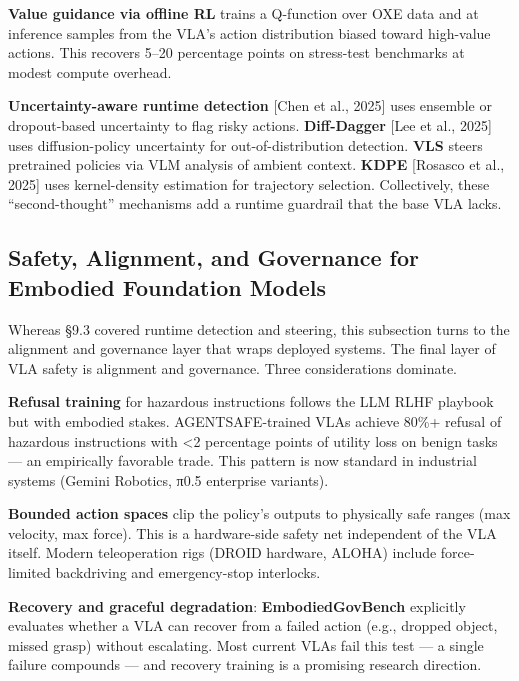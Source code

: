 \documentclass{article}
\begin{document}
\textbf{Value guidance via offline RL} \cite{nakamoto2024steeringyourgenera} trains a Q-function over OXE data and at inference samples from the VLA's action distribution biased toward high-value actions. This recovers 5--20 percentage points on stress-test benchmarks at modest compute overhead.

\textbf{Uncertainty-aware runtime detection} {[}Chen et al., 2025{]} uses ensemble or dropout-based uncertainty to flag risky actions. \textbf{Diff-Dagger} {[}Lee et al., 2025{]} uses diffusion-policy uncertainty for out-of-distribution detection. \textbf{VLS} \cite{liu2026vlssteeringpretrai} steers pretrained policies via VLM analysis of ambient context. \textbf{KDPE} {[}Rosasco et al., 2025{]} uses kernel-density estimation for trajectory selection. Collectively, these ``second-thought'' mechanisms add a runtime guardrail that the base VLA lacks.

\subsection{Safety, Alignment, and Governance for Embodied Foundation Models}\label{safety-alignment-and-governance-for-embodied-foundation-models}

Whereas §9.3 covered runtime detection and steering, this subsection turns to the alignment and governance layer that wraps deployed systems. The final layer of VLA safety is alignment and governance. Three considerations dominate.

\textbf{Refusal training} for hazardous instructions follows the LLM RLHF playbook but with embodied stakes. AGENTSAFE-trained VLAs achieve 80\%+ refusal of hazardous instructions with \textless2 percentage points of utility loss on benign tasks --- an empirically favorable trade. This pattern is now standard in industrial systems (Gemini Robotics, π0.5 enterprise variants).

\textbf{Bounded action spaces} clip the policy's outputs to physically safe ranges (max velocity, max force). This is a hardware-side safety net independent of the VLA itself. Modern teleoperation rigs (DROID hardware, ALOHA) include force-limited backdriving and emergency-stop interlocks.

\textbf{Recovery and graceful degradation}: \textbf{EmbodiedGovBench} \cite{qin2026embodiedgovbenchab} explicitly evaluates whether a VLA can recover from a failed action (e.g., dropped object, missed grasp) without escalating. Most current VLAs fail this test --- a single failure compounds --- and recovery training is a promising research direction.
\end{document}
